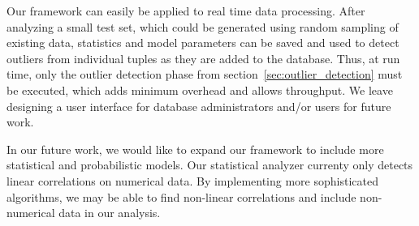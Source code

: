 
Our framework can easily be applied to real time data processing.
After analyzing a small test set, which could be generated using random sampling of existing data, statistics and model parameters can be saved and used to detect outliers from individual tuples as they are added to the database.
Thus, at run time, only the outlier detection phase from section~\ref{sec:outlier_detection} must be executed, which adds minimum overhead and allows throughput.
We leave designing a user interface for database administrators and/or users for future work.

In our future work, we would like to expand our framework to include more statistical and probabilistic models.
Our statistical analyzer currenty only detects linear correlations on numerical data.
By implementing more sophisticated algorithms, we may be able to find non-linear correlations and include non-numerical data in our analysis.
